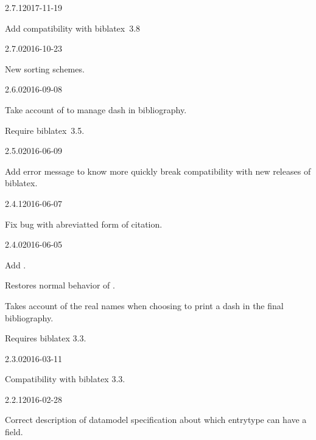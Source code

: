 \documentclass{ltxdockit}[2011/03/25]
\newcommand{\biblatex}{biblatex\xspace}
\begin{document}
\begin{changelog}

\begin{release}{2.7.1}{2017-11-19}
  \item Add compatibility with \biblatex~3.8
\end{release}

\begin{release}{2.7.0}{2016-10-23}
  \item New sorting schemes.
\end{release}

\begin{release}{2.6.0}{2016-09-08}
  \item Take account of  to manage dash in bibliography.
  \item Require \biblatex\ 3.5.
\end{release}

\begin{release}{2.5.0}{2016-06-09}
  \item Add error message to know more quickly break compatibility with new releases of biblatex.
\end{release}
  
  \begin{release}{2.4.1}{2016-06-07}
    \item Fix bug with abreviatted form of citation.
  \end{release}
  \begin{release}{2.4.0}{2016-06-05}
    \item Add .
    \item Restores normal behavior of .
    \item Takes account of the real names when choosing to print a dash in the final bibliography.
    \item Requires biblatex 3.3.
  \end{release}

  \begin{release}{2.3.0}{2016-03-11}
  \item Compatibility with biblatex 3.3.
  \end{release}

  \begin{release}{2.2.1}{2016-02-28}
  \item Correct description of datamodel specification about which entrytype can have a  field.
  \end{release}



\end{changelog}
\end{document}
